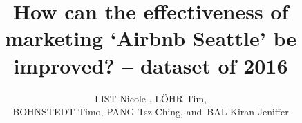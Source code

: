 %
%




\documentclass[journal]{IEEEtran}

\renewcommand\thesection{\arabic{section}} 
\renewcommand\thesubsectiondis{\thesection.\arabic{subsection}}
\renewcommand\thesubsubsectiondis{\thesubsectiondis.\alph{subsubsection}}
\renewcommand\theparagraphdis{\arabic{paragraph}.}

\usepackage{xcolor,soul,framed} %

\usepackage[pdftex]{graphicx}
\graphicspath{{../pdf/}{../jpeg/}}

\usepackage[cmex10]{amsmath}
\usepackage{array}
\usepackage{mdwmath}
\usepackage{mdwtab}
\usepackage{eqparbox}
\usepackage{url}





    \title{How can the effectiveness of marketing ‘Airbnb Seattle’ be improved?
– dataset of 2016 
}
  \author{LIST Nicole ,
      L\"OHR Tim,\\
      BOHNSTEDT Timo,
      PANG Tsz Ching,
      and~BAL Kiran Jeniffer%
}



\maketitle



